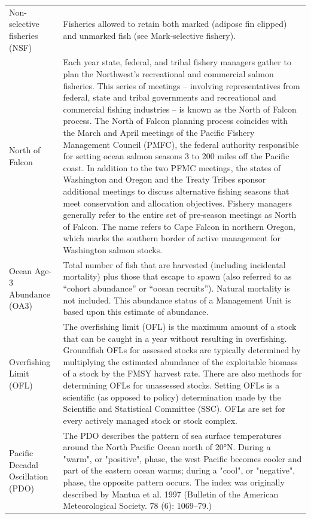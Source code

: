 \documentclass[
  letterpaper,
  DIV=11,
  numbers=noendperiod]{scrartcl}
\begin{document}
\begin{table}
\begin{tabular*}{\linewidth}{@{\extracolsep{\fill}}ll}
Non-selective fisheries (NSF) & Fisheries allowed to retain both marked (adipose fin clipped) and unmarked fish (see Mark-selective fishery). \\ 
North of Falcon & Each year state, federal, and tribal fishery managers gather to plan the Northwest's recreational and commercial salmon fisheries. This series of meetings – involving representatives from federal, state and tribal governments and recreational and commercial fishing industries – is known as the North of Falcon process. The North of Falcon planning process coincides with the March and April meetings of the Pacific Fishery Management Council (PMFC), the federal authority responsible for setting ocean salmon seasons 3 to 200 miles off the Pacific coast. In addition to the two PFMC meetings, the states of Washington and Oregon and the Treaty Tribes sponsor additional meetings to discuss alternative fishing seasons that meet conservation and allocation objectives. Fishery managers generally refer to the entire set of pre-season meetings as North of Falcon. The name refers to Cape Falcon in northern Oregon, which marks the southern border of active management for Washington salmon stocks. \\ 
Ocean Age-3 Abundance (OA3) & Total number of fish that are harvested (including incidental mortality) plus those that escape to spawn (also referred to as “cohort abundance” or “ocean recruits”). Natural mortality is not included. This abundance status of a Management Unit is based upon this estimate of abundance. \\ 
Overfishing Limit (OFL) & The overfishing limit (OFL) is the maximum amount of a stock that can be caught in a year without resulting in overfishing. Groundfish OFLs for assessed stocks are typically determined by multiplying the estimated abundance of the exploitable biomass of a stock by the FMSY harvest rate. There are also methods for determining OFLs for unassessed stocks. Setting OFLs is a scientific (as opposed to policy) determination made by the Scientific and Statistical Committee (SSC). OFLs are set for every actively managed stock or stock complex. \\ 
Pacific Decadal Oscillation (PDO) & The PDO describes the pattern of sea surface temperatures around the North Pacific Ocean north of 20°N.  During a "warm", or "positive", phase, the west Pacific becomes cooler and part of the eastern ocean warms; during a "cool", or "negative", phase, the opposite pattern occurs.  The index was originally described by Mantua et al. 1997 (Bulletin of the American Meteorological Society. 78 (6): 1069–79.) \\ 

\end{tabular*}
\end{table}
\end{document}
